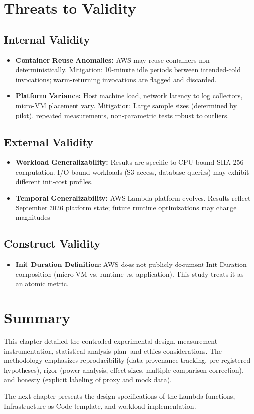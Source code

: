 \section{Threats to Validity}

\subsection{Internal Validity}

\begin{itemize}
    \item \textbf{Container Reuse Anomalies:} AWS may reuse containers non-deterministically. Mitigation: 10-minute idle periods between intended-cold invocations; warm-returning invocations are flagged and discarded.
    \item \textbf{Platform Variance:} Host machine load, network latency to log collectors, micro-VM placement vary. Mitigation: Large sample sizes (determined by pilot), repeated measurements, non-parametric tests robust to outliers.
\end{itemize}

\subsection{External Validity}

\begin{itemize}
    \item \textbf{Workload Generalizability:} Results are specific to CPU-bound SHA-256 computation. I/O-bound workloads (S3 access, database queries) may exhibit different init-cost profiles.
    \item \textbf{Temporal Generalizability:} AWS Lambda platform evolves. Results reflect September 2026 platform state; future runtime optimizations may change magnitudes.
\end{itemize}

\subsection{Construct Validity}

\begin{itemize}
    \item \textbf{Init Duration Definition:} AWS does not publicly document Init Duration composition (micro-VM vs. runtime vs. application). This study treats it as an atomic metric.
\end{itemize}

\section{Summary}

This chapter detailed the controlled experimental design, measurement instrumentation, statistical analysis plan, and ethics considerations. The methodology emphasizes reproducibility (data provenance tracking, pre-registered hypotheses), rigor (power analysis, effect sizes, multiple comparison correction), and honesty (explicit labeling of proxy and mock data).

The next chapter presents the design specifications of the Lambda functions, Infrastructure-as-Code template, and workload implementation.